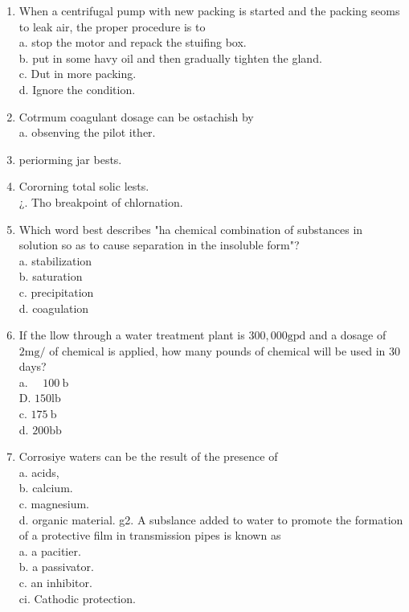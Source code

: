 \documentclass[10pt]{article}
\begin{document}
\begin{enumerate}
  \item When a centrifugal pump with new packing is started and the packing seoms to leak air, the proper procedure is to\\
a. stop the motor and repack the stuifing box.\\
b. put in some havy oil and then gradually tighten the gland.\\
c. Dut in more packing.\\
d. Ignore the condition.

  \item Cotrmum coagulant dosage can be ostachish by\\
a. obsenving the pilot ither.

  \item periorming jar bests.

  \item Cororning total solic lests.\\
¿. Tho breakpoint of chlornation.

  \item Which word best describes "ha chemical combination of substances in solution so as to cause separation in the insoluble form"?\\
a. stabilization\\
b. saturation\\
c. precipitation\\
d. coagulation

  \item If the llow through a water treatment plant is $300,000 \mathrm{gpd}$ and a dosage of $2 \mathrm{mg} /$ of chemical is applied, how many pounds of chemical will be used in 30 days?\\
a. $\quad 100 \mathrm{~b}$\\
D. $150 \mathrm{lb}$\\
c. $175 \mathrm{~b}$\\
d. $200 \mathrm{bb}$

  \item Corrosiye waters can be the result of the presence of\\
a. acids,\\
b. calcium.\\
c. magnesium.\\
d. organic material. g2. A subslance added to water to promote the formation of a protective film in transmission pipes is known as\\
a. a pacitier.\\
b. a passivator.\\
c. an inhibitor.\\
ci. Cathodic protection.


\end{enumerate}
\end{document}

